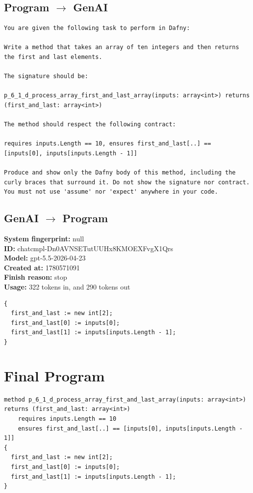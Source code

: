 \documentclass{article}
\begin{document}
\subsection*{Program $\rightarrow$ GenAI}
\begin{lstlisting}
You are given the following task to perform in Dafny:

Write a method that takes an array of ten integers and then returns the first and last elements.

The signature should be:

p_6_1_d_process_array_first_and_last_array(inputs: array<int>) returns (first_and_last: array<int>)

The method should respect the following contract:

requires inputs.Length == 10, ensures first_and_last[..] == [inputs[0], inputs[inputs.Length - 1]]

Produce and show only the Dafny body of this method, including the curly braces that surround it. Do not show the signature nor contract. You must not use 'assume' nor 'expect' anywhere in your code.
\end{lstlisting}
\subsection*{GenAI $\rightarrow$ Program}
\textbf{System fingerprint: }null
\\\textbf{ID: }chatcmpl-Dn0AVNSETutUUHx8KMOEXFvgX1Qrs
\\\textbf{Model: }gpt-5.5-2026-04-23
\\\textbf{Created at: }1780571091
\\\textbf{Finish reason: }stop
\\\textbf{Usage: }322 tokens in, and 290 tokens out
\begin{lstlisting}
{
  first_and_last := new int[2];
  first_and_last[0] := inputs[0];
  first_and_last[1] := inputs[inputs.Length - 1];
}
\end{lstlisting}
\section*{Final Program}
\begin{lstlisting}
method p_6_1_d_process_array_first_and_last_array(inputs: array<int>) returns (first_and_last: array<int>)
	requires inputs.Length == 10
	ensures first_and_last[..] == [inputs[0], inputs[inputs.Length - 1]]
{
  first_and_last := new int[2];
  first_and_last[0] := inputs[0];
  first_and_last[1] := inputs[inputs.Length - 1];
}
\end{lstlisting}
\end{document}
